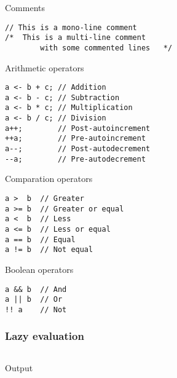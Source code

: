 \documentclass[11pt]{beamer}
\begin{document}
\begin{frame}[fragile]
\begin{block}{Comments}
\small
\begin{lstlisting}[language=lekta]
// This is a mono-line comment
/*	This is a multi-line comment
		with some commented lines	*/
\end{lstlisting}
\end{block}
\pause
{}
\begin{block}{Arithmetic operators}
\begin{lstlisting}[language=lekta]
a <- b + c; // Addition
a <- b - c; // Subtraction
a <- b * c; // Multiplication
a <- b / c; // Division
a++;        // Post-autoincrement
++a;        // Pre-autoincrement
a--;        // Post-autodecrement
--a;        // Pre-autodecrement
\end{lstlisting}
\end{block}
\end{frame}

\begin{frame}[fragile]
\begin{block}{Comparation operators}
\begin{lstlisting}[language=lekta]
a >  b  // Greater
a >= b  // Greater or equal
a <  b  // Less
a <= b  // Less or equal
a == b  // Equal
a != b  // Not equal
\end{lstlisting}
\end{block}
\pause
{}
\begin{block}{Boolean operators}
\begin{lstlisting}[language=lekta]
a && b  // And
a || b  // Or
!! a    // Not
\end{lstlisting}
\end{block}
\end{frame}

\begin{frame}[fragile]
\frametitle{Lazy evaluation}
\begin{lstlisting}[language=lekta]
\end{lstlisting}
\pause
{}
\begin{block}{Output}
\begin{lstlisting}[language=lekta]
\end{lstlisting}
\end{block}
\end{frame}
\end{document}
